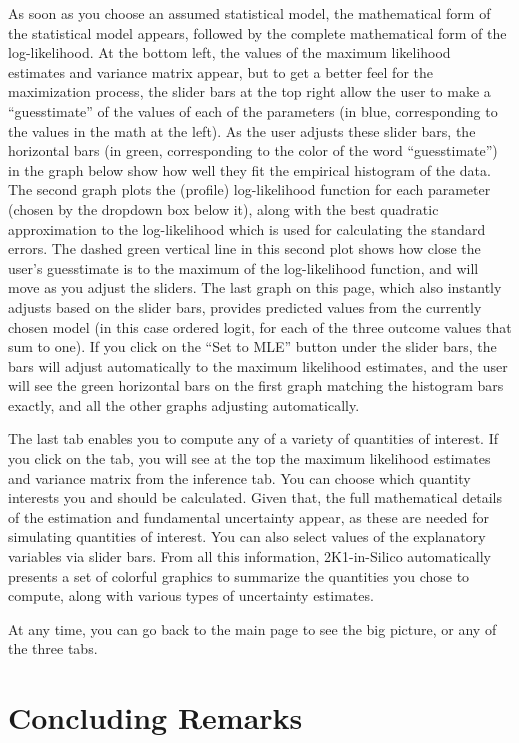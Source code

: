 \documentclass[12pt]{article}
\theoremstyle{definition}
\begin{document}
As soon as you choose an assumed statistical model, the mathematical form of the statistical model appears, followed by the complete mathematical form of the log-likelihood.  At the bottom left, the values of the maximum likelihood estimates and variance matrix appear, but to get a better feel for the maximization process, the slider bars at the top right allow the user to make a ``guesstimate'' of the values of each of the parameters (in blue, corresponding to the values in the math at the left). As the user adjusts these slider bars, the horizontal bars (in green, corresponding to the color of the word ``guesstimate'') in the graph below show how well they fit the empirical histogram of the data. The second graph plots the (profile) log-likelihood function for each parameter (chosen by the dropdown box below it), along with the best quadratic approximation to the log-likelihood which is used for calculating the standard errors.  The dashed green vertical line in this second plot shows how close the user's guesstimate is to the maximum of the log-likelihood function, and will move as you adjust the sliders.  The last graph on this page, which also instantly adjusts based on the slider bars, provides predicted values from the currently chosen model (in this case ordered logit, for each of the three outcome values that sum to one).  If you click on the ``Set to MLE'' button under the slider bars, the bars will adjust automatically to the maximum likelihood estimates, and the user will see the green horizontal bars on the first graph matching the histogram bars exactly, and all the other graphs adjusting automatically.

The last tab enables you to compute any of a variety of quantities of interest.  If you click on the tab, you will see at the top the maximum likelihood estimates and variance matrix from the inference tab. You can choose which quantity interests you and should be calculated.  Given that, the full mathematical details of the estimation and fundamental uncertainty appear, as these are needed for simulating quantities of interest. You can also select values of the explanatory variables via slider bars.  From all this information, 2K1-in-Silico automatically presents a set of colorful graphics to summarize the quantities you chose to compute, along with various types of uncertainty estimates.

At any time, you can go back to the main page to see the big picture, or any of the three tabs.

\section{Concluding Remarks}
\end{document}

